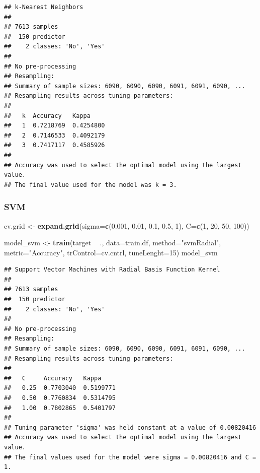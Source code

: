 \documentclass[
]{article}
\newenvironment{Shaded}{\begin{snugshade}}{\end{snugshade}}
\newcommand{\DataTypeTok}[1]{\textcolor[rgb]{0.13,0.29,0.53}{#1}}
\newcommand{\DecValTok}[1]{\textcolor[rgb]{0.00,0.00,0.81}{#1}}
\newcommand{\FloatTok}[1]{\textcolor[rgb]{0.00,0.00,0.81}{#1}}
\newcommand{\KeywordTok}[1]{\textcolor[rgb]{0.13,0.29,0.53}{\textbf{#1}}}
\newcommand{\NormalTok}[1]{#1}
\newcommand{\OperatorTok}[1]{\textcolor[rgb]{0.81,0.36,0.00}{\textbf{#1}}}
\newcommand{\StringTok}[1]{\textcolor[rgb]{0.31,0.60,0.02}{#1}}
\begin{document}
\begin{verbatim}
## k-Nearest Neighbors 
## 
## 7613 samples
##  150 predictor
##    2 classes: 'No', 'Yes' 
## 
## No pre-processing
## Resampling: 
## Summary of sample sizes: 6090, 6090, 6090, 6091, 6091, 6090, ... 
## Resampling results across tuning parameters:
## 
##   k  Accuracy   Kappa    
##   1  0.7218769  0.4254800
##   2  0.7146533  0.4092179
##   3  0.7417117  0.4585926
## 
## Accuracy was used to select the optimal model using the largest value.
## The final value used for the model was k = 3.
\end{verbatim}

\hypertarget{svm}{%
\subsubsection{SVM}\label{svm}}

\begin{Shaded}
\begin{Highlighting}[]
\NormalTok{cv.grid <-}\StringTok{ }\KeywordTok{expand.grid}\NormalTok{(}\DataTypeTok{sigma=}\KeywordTok{c}\NormalTok{(}\FloatTok{0.001}\NormalTok{, }\FloatTok{0.01}\NormalTok{, }\FloatTok{0.1}\NormalTok{, }\FloatTok{0.5}\NormalTok{, }\DecValTok{1}\NormalTok{),}
                       \DataTypeTok{C=}\KeywordTok{c}\NormalTok{(}\DecValTok{1}\NormalTok{, }\DecValTok{20}\NormalTok{, }\DecValTok{50}\NormalTok{, }\DecValTok{100}\NormalTok{))}

\NormalTok{model_svm <-}\StringTok{ }\KeywordTok{train}\NormalTok{(target }\OperatorTok{~}\StringTok{ }\NormalTok{., }\DataTypeTok{data=}\NormalTok{train.df,}
                      \DataTypeTok{method=}\StringTok{"svmRadial"}\NormalTok{,}
                      \DataTypeTok{metric=}\StringTok{"Accuracy"}\NormalTok{,}
                      \DataTypeTok{trControl=}\NormalTok{cv.cntrl,}
                      \DataTypeTok{tuneLenght=}\DecValTok{15}\NormalTok{)}
\NormalTok{model_svm}
\end{Highlighting}
\end{Shaded}

\begin{verbatim}
## Support Vector Machines with Radial Basis Function Kernel 
## 
## 7613 samples
##  150 predictor
##    2 classes: 'No', 'Yes' 
## 
## No pre-processing
## Resampling: 
## Summary of sample sizes: 6090, 6090, 6090, 6091, 6091, 6090, ... 
## Resampling results across tuning parameters:
## 
##   C     Accuracy   Kappa    
##   0.25  0.7703040  0.5199771
##   0.50  0.7760834  0.5314795
##   1.00  0.7802865  0.5401797
## 
## Tuning parameter 'sigma' was held constant at a value of 0.00820416
## Accuracy was used to select the optimal model using the largest value.
## The final values used for the model were sigma = 0.00820416 and C = 1.
\end{verbatim}
\end{document}

